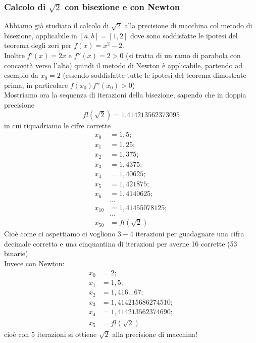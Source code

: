 \documentclass[12pt]{article}
\begin{document}
\subsubsection{Calcolo di $\sqrt{2}$ con bisezione e con Newton}
Abbiamo già studiato il calcolo di $\sqrt{2}$ alla precisione di macchina col metodo di bisezione, applicabile in $[a,b]=[1,2]$ dove sono soddisfatte le ipotesi del teorema degli zeri per $f(x)=x^2-2$.\\ Inoltre $f'(x)=2x$ e $f''(x)=2>0$ (si tratta di un ramo di parabola con concavità verso l'alto) quindi il metodo di Newton è applicabile, partendo ad esempio da $x_0=2$ (essendo soddisfatte tutte le ipotesi del teorema dimostrate prima, in particolare $f(x_0)f''(x_0)>0$)\\
Mostriamo ora la sequenza di iterazioni della bisezione, sapendo che in doppia precisione
\[ fl(\sqrt{2})=1.414213562373095 \]
in cui riquadriamo le cifre corrette
\[ \begin{split}
    x_0 & = \boxed{1},5; \\
    x_1 & = \boxed{1},25; \\
    x_2 & = \boxed{1},375; \\
    x_3 & = \boxed{1,4}375; \\
    x_4 & = \boxed{1,4}0625; \\
    x_5 & = \boxed{1,4}21875; \\
    x_6 & = \boxed{1,41}40625; \\ 
    & \dotso \\
    x_{10} & = \boxed{1,414}55078125; \\
    & \dotso \\
    x_{50} & = fl(\sqrt{2})
\end{split} \]
Cioè come ci aspettiamo ci vogliono $3-4$ iterazioni per guadagnare una cifra decimale corretta e una cinquantina di iterazioni per averne 16 corrette (53 binarie).\\
Invece con Newton:
\[ \begin{split}
    x_0 & = 2; \\
    x_1 & = \boxed{1},5; \\
    x_2 & = \boxed{1,41}6...67; \\
    x_3 & = \boxed{1,41421}5686274510; \\ 
    x_4 & = \boxed{1,41421356237}4690; \\ 
    x_5 & = fl(\sqrt{2})
\end{split} \]
cioè con 5 iterazioni si ottiene $\sqrt{2}$ alla precisione di macchina!\\
\end{document}
